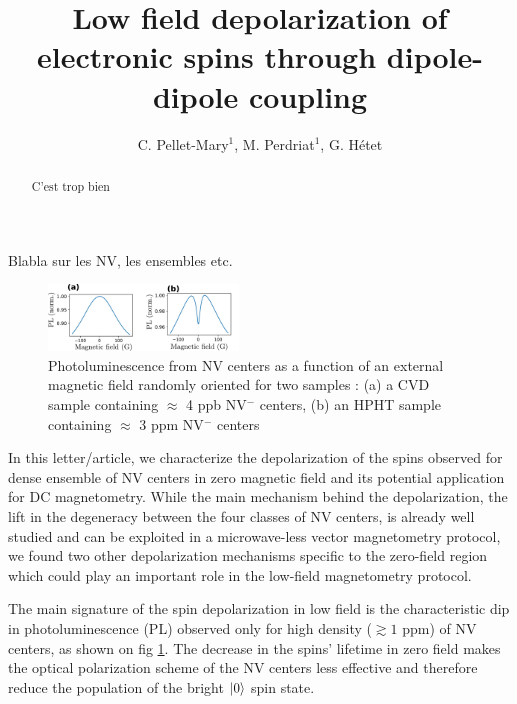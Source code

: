 \documentclass[preprintnumbers,amsmath,amssymb,superscriptaddress,twocolumn,showpacs]{revtex4-2}
\begin{document}
\title{Low field depolarization of electronic spins through dipole-dipole coupling}

\author{C. Pellet-Mary$^1$, M. Perdriat$^1$, G. H\'etet} 


\begin{abstract}
C'est trop bien
\end{abstract}

\maketitle
Blabla sur les NV, les ensembles etc.




\begin{figure}
\includegraphics[width=0.45\textwidth]{Figures/fig dense vs pas dense}
\caption{Photoluminescence from NV centers as a function of an external magnetic field randomly oriented for two samples : (a) a CVD sample containing $\approx$ 4 ppb NV$^-$ centers, (b) an HPHT sample containing $\approx$ 3 ppm NV$^-$ centers}
\label{PL_NV_density}
\end{figure}

In this letter/article, we characterize the depolarization of the spins observed for dense ensemble of NV centers in zero magnetic field and its potential application for DC magnetometry. While the main mechanism behind the depolarization, the lift in the degeneracy between the four classes of NV centers, is already well studied and can be exploited in a microwave-less vector magnetometry protocol, we found two other depolarization mechanisms specific to the zero-field region which could play an important role in the low-field magnetometry protocol.

The main signature of the spin depolarization in low field is the characteristic dip in photoluminescence (PL) observed only for high density ($\gtrsim 1$ ppm) of NV centers, as shown on fig \ref{PL_NV_density}. The decrease in the spins' lifetime in zero field makes the optical polarization scheme of the NV centers less effective and therefore reduce the population of the bright $\ket{0}$ spin state. %
\end{document}
